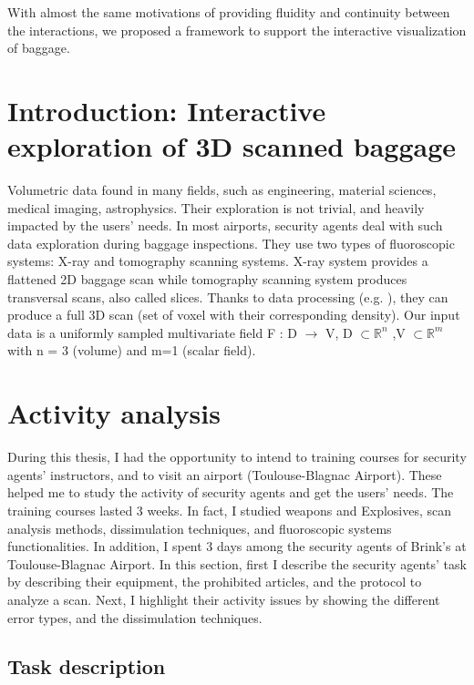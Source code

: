 With almost the same motivations of providing fluidity and continuity between the interactions, we proposed a framework to support the interactive visualization of baggage.

\section{Introduction: Interactive exploration of 3D scanned baggage}
Volumetric data found in many fields, such as engineering, material sciences, medical imaging, astrophysics. Their exploration is not trivial, and heavily impacted by the users' needs. In most airports, security agents deal with such data exploration during baggage inspections. They use two types of fluoroscopic systems: X-ray and tomography scanning systems. X-ray system provides a flattened 2D baggage scan while tomography scanning system produces transversal scans, also called slices. 
Thanks to data processing (e.g. \cite{deans2007radon}), they can produce a full 3D scan (set of voxel with their corresponding density).
Our input data is a uniformly sampled multivariate field F : D $\longrightarrow$ V, D $\subset \mathbb{R}^{n}$ 
,V $\subset \mathbb{R}^{m}$ with n = 3 (volume) and m=1 (scalar field).



\section{Activity analysis}

During this thesis, I had the opportunity to intend to training courses for security agents' instructors, and to visit an airport (Toulouse-Blagnac Airport). These helped me to study the activity of security agents and get the users' needs. The training courses lasted 3 weeks. In fact, I studied weapons and Explosives, scan analysis methods, dissimulation techniques, and fluoroscopic systems functionalities. In addition, I spent 3 days among the security agents of Brink's at Toulouse-Blagnac Airport. In this section, first I describe the security agents' task by describing their equipment, the prohibited articles, and the protocol to analyze a scan. Next, I highlight their activity issues by showing the different error types, and the dissimulation techniques.

\subsection{Task description}

